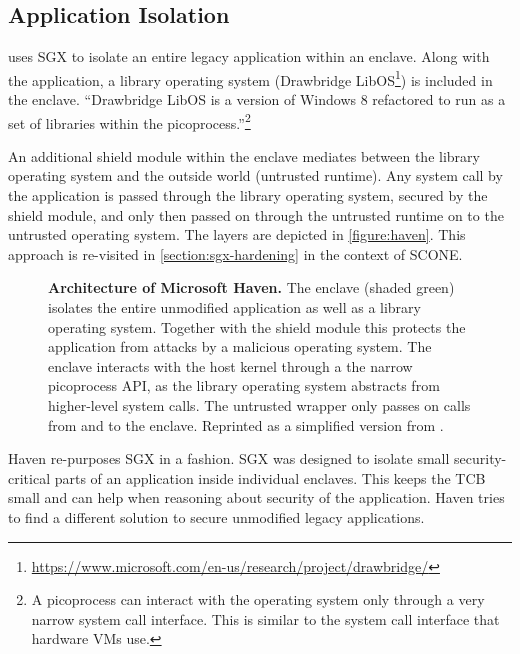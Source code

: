 \subsection{Application Isolation\label{ID_94612974}\label{section:tc-apps}}
\begin{description}\label{ID_82011801}
\item[Microsoft Haven\cite{Baumann2014}]\label{ID_353301403}
uses SGX to isolate an entire legacy application within an enclave.\label{ID_97042978}
Along with the application, a library operating system (Drawbridge LibOS\footnote{\url{https://www.microsoft.com/en-us/research/project/drawbridge/}}) is included in the enclave.\label{ID_1807131257}
``Drawbridge LibOS is a version of Windows 8 refactored to run as a set of libraries within the picoprocess.''\footnote{A picoprocess can interact with the operating system only through a very narrow system call interface. This is similar to the system call interface that hardware VMs use.}\label{ID_465258009}

An additional shield module within the enclave mediates between the library operating system and the outside world (untrusted runtime).\label{ID_1475060210}
Any system call by the application is passed through the library operating system, secured by the shield module, and only then passed on through the untrusted runtime on to the untrusted operating system. The layers are depicted in \autoref{figure:haven}.\label{ID_1924838776}
This approach is re-visited in \autoref{section:sgx-hardening} in the context of SCONE.\cite[]{Arnautov2016}\label{ID_1989885067}
\begin{figure}[htbp]
\makebox[\textwidth][c]{
}\caption{\textbf{Architecture of Microsoft Haven.}\label{ID_186584288}
The enclave (shaded green) isolates the entire unmodified application as well as a library operating system.\label{ID_1502290495}
Together with the shield module this protects the application from attacks by a malicious operating system.\label{ID_524857908}
The enclave interacts with the host kernel through a the narrow picoprocess API, as the library operating system abstracts from higher-level system calls.\label{ID_1865559949}
The untrusted wrapper only passes on calls from and to the enclave.\label{ID_1698784106}
Reprinted as a simplified version from \cite{Baumann2014}.\label{ID_1354023484}
\label{ID_1468585962}\label{figure:haven}}
\end{figure}


Haven re-purposes SGX in a fashion. SGX was designed to isolate small security-critical parts of an application inside individual enclaves.\label{ID_679922183}
This keeps the TCB small and can help when reasoning about security of the application.\label{ID_158610913}
Haven tries to find a different solution to secure unmodified legacy applications.\label{ID_1158551044}


\end{description}
